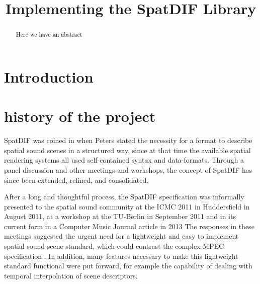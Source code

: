 \documentclass{article}
\title{Implementing the SpatDIF Library}
\begin{document}
%

\makeatletter 
\def\ps@myheadings{%
\let\ps@jpl@in\ps@plain%
\def\@evenhead{\reset@font\hfil\leftmark\hfil}%
\def\@oddhead{\reset@font\hfil\rightmark\hfil}%
\let\@mkboth\@gobbletwo%
\let\sectionmark\@gobble%
\let\subsectionmark\@gobble%
% 
\def\@oddfoot{\reset@font\hfil-- \thepage --\hfil}%
\let\@evenfoot\@oddfoot 
} 
\makeatother 
\setcounter{page}{17} 
\pagestyle{myheadings} 
\maketitle
\thispagestyle{myheadings}

\begin{abstract}

Here we have an abstract

\end{abstract}

\section{Introduction}


\section{history of the project} %
SpatDIF was coined in \cite{peters_caa07} when Peters stated the necessity for a format to describe spatial sound scenes in a structured way, since at that time the available spatial rendering systems all used self-contained syntax and data-formats. 
Through a panel discussion \cite{2008ICMCpanel, Peters:2008spatdif} and other meetings and workshops, the concept of SpatDIF has since been extended, refined, and consolidated. 

After a long and thoughtful process, the SpatDIF specification was informally presented to the spatial sound community at the ICMC 2011 in Huddersfield in August 2011, at a workshop at the TU-Berlin in September 2011 and in its current form in a Computer Music Journal article in 2013 \cite{}
The responses in these meetings suggested the urgent need for a lightweight and easy to implement spatial sound scene standard, which could contrast the complex MPEG specification \cite{scheirer1999audiobifs}.  
In addition, many features necessary to make this lightweight standard functional were put forward, for example the capability of dealing with temporal interpolation of scene descriptors. 
\end{document}
